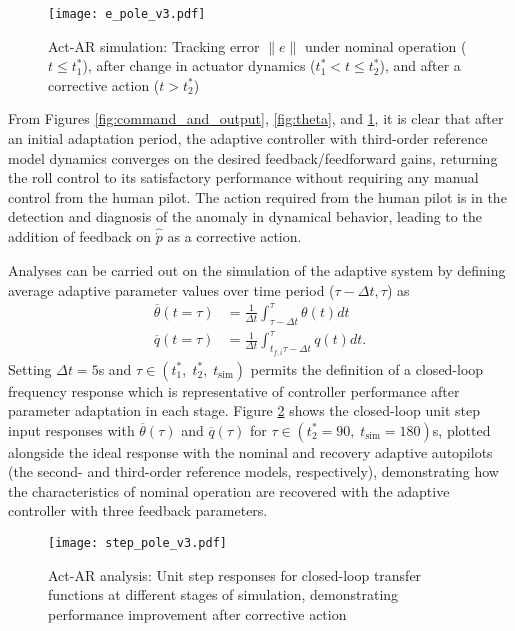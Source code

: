 \begin{figure}[h!]
	\centering
	\texttt{[image: e\_pole\_v3.pdf]}
	\caption{Act-AR simulation: Tracking error $\|e\|$ under nominal operation ($t \leq t_1^*$), after change in actuator dynamics ($t_1^* < t \leq t_2^*$), and after a corrective action ($t > t_2^*$)}
	\label{fig:error}
\end{figure}

From Figures \ref{fig:command_and_output}, \ref{fig:theta}, and \ref{fig:error}, it is clear that after an initial adaptation period, the adaptive controller with third-order reference model dynamics converges on the desired feedback/feedforward gains, returning the roll control to its satisfactory performance without requiring any manual control from the human pilot. The action required from the human pilot is in the detection and diagnosis of the anomaly in dynamical behavior, leading to the addition of feedback on $\hat{\dot{p}}$ as a corrective action. 

Analyses can be carried out on the simulation of the adaptive system by defining average adaptive parameter values over time period ($\tau - \Delta t, \tau$) as
\begin{align}
	\overline{\theta}(t=\tau) &= \frac{1}{\Delta t} \int_{\tau-\Delta t}^{\tau} \theta(t) dt \label{eqn:theta_bar}\\
	\overline{q} (t=\tau) &= \frac{1}{\Delta t} \int_{t_{f,i}\tau-\Delta t}^{\tau} q(t) dt.\label{eqn:q_bar}
\end{align}
Setting $\Delta t = 5$s and $\tau \in (t_1^*, \; t_2^*, \; t_{\textrm{sim}})$ permits the definition of a closed-loop frequency response which is representative of controller performance after parameter adaptation in each stage. Figure \ref{fig:step_pole} shows the closed-loop unit step input responses with $\overline{\theta}(\tau)$ and $\overline{q}(\tau)$ for $\tau \in (t_2^* = 90, \; t_{\textrm{sim}} = 180)$s, plotted alongside the ideal response with the nominal and recovery adaptive autopilots (the second- and third-order reference models, respectively), demonstrating how the characteristics of nominal operation are recovered with the adaptive controller with three feedback parameters.

\begin{figure}[h!]
	\centering
	\texttt{[image: step\_pole\_v3.pdf]}
	\caption{Act-AR analysis: Unit step responses for closed-loop transfer functions at different stages of simulation, demonstrating performance improvement after corrective action}
	\label{fig:step_pole}
\end{figure}

